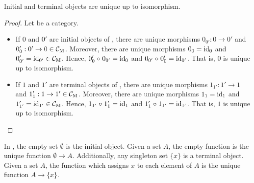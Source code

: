 \begin{lemma}
  Initial and terminal objects are unique up to isomorphism.

  \begin{proof}

    Let  be a category.
    \begin{itemize}
    \item

      If $0$ and $0'$ are initial objects of , there are unique
      morphisms $0_{0'}: 0 \to 0'$ and $0'_{0}: 0' \to 0 \in
      \mathcal{C}_{\operatorname{M}}$. Moreover, there are unique morphisms $0_{0} =
      \operatorname{id}_{0}$ and $0'_{0'} = \operatorname{id}_{0'} \in \mathcal{C}_{\operatorname{M}}$. Hence, $0'_{0}
      \mathrel{\circ} 0_{0'} = \operatorname{id}_{0}$ and $0_{0'} \mathrel{\circ} 0'_{0} = \operatorname{id}_{0'}$.
      That is, $0$ is unique up to isomorphism.

    \item

      If $1$ and $1'$ are terminal objects of , there are
      unique morphisms $1_{1'}: 1' \to 1$ and $1'_{1}: 1 \to 1' \in
      \mathcal{C}_{\operatorname{M}}$. Moreover, there are unique morphisms $1_{1} =
      \operatorname{id}_{1}$ and $1'_{1'} = \operatorname{id}_{1'} \in \mathcal{C}_{\operatorname{M}}$. Hence, $1_{1'}
      \mathrel{\circ} 1'_{1} = \operatorname{id}_{1}$ and $1'_{1} \mathrel{\circ} 1_{1'} = \operatorname{id}_{1'}$.
      That is, $1$ is unique up to isomorphism.

    \end{itemize}

  \end{proof}

\end{lemma}

\begin{example}

  \label{ex:initial-terminal-objects-set}

  In \set, the empty set $\emptyset$ is the initial object. Given a
  set $A$, the empty function is the unique function $\emptyset \to
  A$. Additionally, any singleton set $\{x\}$ is a terminal object.
  Given a set $A$, the function which assigns $x$ to each element of
  $A$ is the unique function $A \to \{x\}$.

\end{example}

